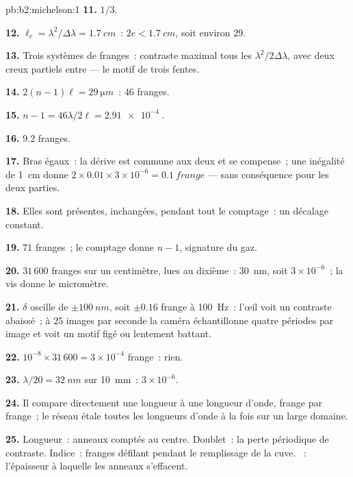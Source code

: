 \begin{solution}{pb:b2:michelson:1}
\textbf{11.} $1/3$.

\textbf{12.} $\ell_c = \lambda^2/\Delta\lambda = \qty{1.7}{cm}$~: $2e < \qty{1.7}{cm}$, soit environ $29$.

\textbf{13.} Trois systèmes de franges~: contraste maximal tous les $\lambda^2/2\Delta\lambda$, avec
deux creux partiels entre --- le motif de trois fentes.

\textbf{14.} $2(n - 1)\ell = \qty{29}{\micro m}$~: $46$ franges.

\textbf{15.} $n - 1 = 46\lambda/2\ell = \qty{2.91e-4}{}$.

\textbf{16.} $9.2$ franges.

\textbf{17.} Bras égaux~: la dérive est commune aux deux et se compense~; une
inégalité de \qty{1}{cm} donne $2 \times 0.01 \times 3 \times 10^{-6} = \qty{0.1}{frange}$ ---
sans conséquence pour les deux parties.

\textbf{18.} Elles sont présentes, inchangées, pendant tout le comptage~: un
décalage constant.

\textbf{19.} $71$ franges~; le comptage donne $n - 1$, signature du gaz.

\textbf{20.} $31\,600$ franges sur un centimètre, lues au dixième~:
\qty{30}{nm}, soit $3 \times 10^{-6}$~; la vis donne le micromètre.

\textbf{21.} $\delta$ oscille de $\pm\qty{100}{nm}$, soit $\pm0.16$ frange à \qty{100}{Hz}~:
l'œil voit un contraste abaissé~; à $25$ images par seconde la caméra
échantillonne quatre périodes par image et voit un motif figé ou lentement
battant.

\textbf{22.} $10^{-8} \times 31\,600 = 3 \times 10^{-4}$ frange~: rien.

\textbf{23.} $\lambda/20 = \qty{32}{nm}$ sur \qty{10}{mm}~: $3 \times 10^{-6}$.

\textbf{24.} Il compare directement une longueur à une longueur d'onde, frange par
frange~; le réseau étale toutes les longueurs d'onde à la fois sur un large domaine.

\textbf{25.} Longueur~: anneaux comptés au centre. Doublet~: la
perte périodique de contraste. Indice~: franges défilant pendant le remplissage
de la cuve. ~: l'épaisseur à laquelle les anneaux s'effacent.
\end{solution}
